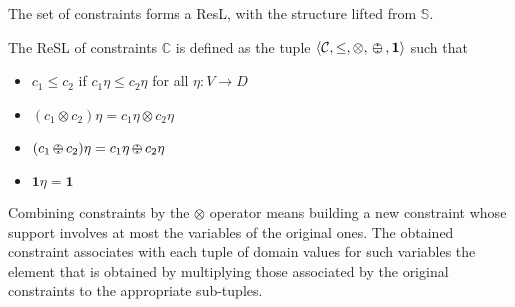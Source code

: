 \documentclass{llncs}
\def\monid{{\mathbf 0}}
\def\monop{\otimes}
\def\odiv{\, {\ominus\hspace{-7.7pt} \div} \,}
\def\monid{\mathbf{1}}
\begin{document}
\smallskip
The set of constraints forms a ResL, with the structure
lifted from ${\mathbb S}$.

\begin{lemma}\label{prop:soft}
	The ReSL of constraints $\mathbb C$ is
	defined as the tuple $\langle {\mathcal C}, \leq, \monop, \odiv, \monid \rangle$ such that
	
	\begin{itemize}
		\item $c_1 \leq c_2$ if $c_1\eta\leq c_2\eta$ for all $\eta: V \rightarrow D$
		\item $(c_1\monop c_2)\eta = c_1\eta\monop c_2\eta$ %
		\item $(c_1\odiv c_2)\eta = c_1\eta\odiv c_2\eta$ %
		\item $\monid \eta = \monid$
	\end{itemize}
\end{lemma}


Combining constraints by the $\monop$ operator
means building a new constraint whose support involves at most
the variables of the original ones. The obtained constraint  associates with
each tuple of domain values for such variables the element
that is obtained by multiplying  those associated by the
original constraints to the appropriate sub-tuples.
%
\end{document}
